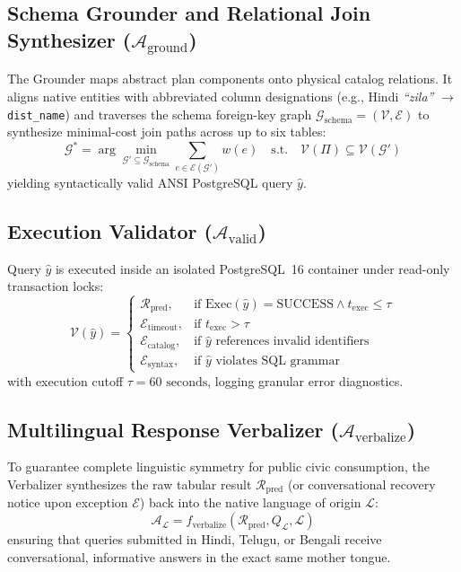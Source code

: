 \documentclass[conference]{IEEEtran}
\begin{document}
\subsection{Schema Grounder and Relational Join Synthesizer ($\mathcal{A}_{\text{ground}}$)}
The Grounder maps abstract plan components onto physical catalog relations. It aligns native entities with abbreviated column designations (e.g., Hindi \emph{``zila''} $\rightarrow$ \texttt{dist\_name}) and traverses the schema foreign-key graph $\mathcal{G}_{\text{schema}} = (\mathcal{V}, \mathcal{E})$ to synthesize minimal-cost join paths across up to six tables:
\begin{equation}
    \mathcal{G}^* = \arg\min_{\mathcal{G}' \subseteq \mathcal{G}_{\text{schema}}} \sum_{e \in \mathcal{E}(\mathcal{G}')} w(e) \quad \text{s.t.} \quad \mathcal{V}(\Pi) \subseteq \mathcal{V}(\mathcal{G}')
\end{equation}
yielding syntactically valid ANSI PostgreSQL query $\hat{y}$.

\subsection{Execution Validator ($\mathcal{A}_{\text{valid}}$)}
Query $\hat{y}$ is executed inside an isolated PostgreSQL~16 container under read-only transaction locks:
\begin{equation}
    \mathcal{V}(\hat{y}) = 
    \begin{cases} 
        \mathcal{R}_{\text{pred}}, & \text{if } \text{Exec}(\hat{y}) = \text{SUCCESS} \land t_{\text{exec}} \le \tau \\
        \mathcal{E}_{\text{timeout}}, & \text{if } t_{\text{exec}} > \tau \\
        \mathcal{E}_{\text{catalog}}, & \text{if } \hat{y} \text{ references invalid identifiers} \\
        \mathcal{E}_{\text{syntax}}, & \text{if } \hat{y} \text{ violates SQL grammar}
    \end{cases}
\end{equation}
with execution cutoff $\tau = 60\text{ seconds}$, logging granular error diagnostics.

\subsection{Multilingual Response Verbalizer ($\mathcal{A}_{\text{verbalize}}$)}
To guarantee complete linguistic symmetry for public civic consumption, the Verbalizer synthesizes the raw tabular result $\mathcal{R}_{\text{pred}}$ (or conversational recovery notice upon exception $\mathcal{E}$) back into the native language of origin $\mathcal{L}$:
\begin{equation}
    \mathcal{A}_{\mathcal{L}} = f_{\text{verbalize}}(\mathcal{R}_{\text{pred}}, Q_{\mathcal{L}}, \mathcal{L})
\end{equation}
ensuring that queries submitted in Hindi, Telugu, or Bengali receive conversational, informative answers in the exact same mother tongue.
\end{document}
